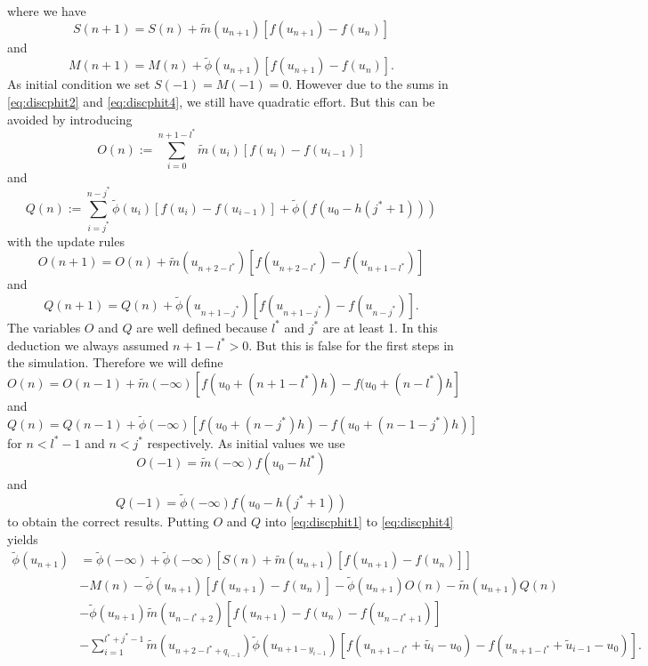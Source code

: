 \documentclass[12pt,a4paper,twoside, open=right]{scrreprt}
\theoremstyle{definition}
\theoremstyle{plain}
\begin{document}
where we have
\begin{equation}
    S(n+1) = S(n)+\tilde{m}(u_{n+1})[f(u_{n+1})-f(u_n)]
\end{equation}
and 
\begin{equation}
    M(n+1) = M(n) + \tilde\phi(u_{n+1})[f(u_{n+1})-f(u_{n})].
\end{equation}
As initial condition we set $S(-1)=M(-1)=0$. However due to the sums in \eqref{eq:discphit2} and \eqref{eq:discphit4}, we still have quadratic effort. But this can be avoided by introducing 
\begin{equation}
    O(n):=\sum_{i=0}^{n+1-l^*}\tilde{m}(u_i)[f(u_i)-f(u_{i-1})]
\end{equation}
and 
\begin{equation}
    Q(n):=\sum_{i=j^*}^{n-j^*}\tilde\phi(u_{i})[f(u_i)-f(u_{i-1})]+\tilde\phi(f(u_0-h(j^*+1)))
\end{equation}
with the update rules
\begin{equation}
O(n+1) = O(n)+\tilde{m}(u_{n+2-l^*})[f(u_{n+2-l^*})-f(u_{n+1-l^*})]
\end{equation}
and 
\begin{equation}
Q(n+1) = Q(n) + \tilde\phi(u_{n+1-j^*})[f(u_{n+1-j^*})-f(u_{n-j^*})].
\end{equation}
The variables $O$ and $Q$ are well defined because $l^*$ and $j^*$ are at least 1. In this deduction we always assumed $n+1-l^*>0$. But this is false for the first steps in the simulation. Therefore we will define
\begin{equation}
    O(n)= O(n-1)+\tilde{m}(-\infty)[f(u_0+(n+1-l^*)h)-f(u_0+(n-l^*)h]
\end{equation}
and 
\begin{equation}
Q(n)= Q(n-1)+\tilde{\phi}(-\infty)[f(u_0+(n-j^*)h)-f(u_0+(n-1-j^*)h)]
\end{equation}
for $n<l^*-1$ and $n<j^*$ respectively. As initial values we use 
\begin{equation}
    O(-1) = \tilde{m}(-\infty)f(u_0-hl^*)
\end{equation}
and
\begin{equation}
    Q(-1) = \tilde{\phi}(-\infty)f(u_0-h(j^*+1))
\end{equation}
to obtain the correct results.
Putting $O$ and $Q$ into \eqref{eq:discphit1} to \eqref{eq:discphit4} yields
\begin{align}
    \tilde\phi(u_{n+1})&=\tilde\phi(-\infty) +\tilde\phi(-\infty)[S(n)+\tilde{m}(u_{n+1})[f(u_{n+1})-f(u_n)]]\\&-M(n) -\tilde\phi(u_{n+1})[f(u_{n+1})-f(u_{n})] -\tilde{\phi}(u_{n+1})O(n)-\tilde{m}(u_{n+1})Q(n)\\&-\tilde\phi(u_{n+1})\tilde{m}(u_{n-l^*+2})[f(u_{n+1})-f(u_n)-f(u_{n-l^*+1})] \\&-\sum_{i=1}^{l^*+j^*-1}\tilde{m}(u_{n+2-l^*+q_{i-1}})\tilde{\phi}(u_{n+1-y_{i-1}})[f(u_{n+1-l^*}+\tilde{u_i}-u_0)-f(u_{n+1-l^*}+\tilde{u}_{i-1}-u_0)].
\end{align}
\end{document}
